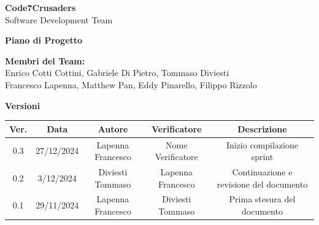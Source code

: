 \documentclass{article}
\begin{document}
\begin{titlepage}
    {\Huge \textbf{Code7Crusaders}}\\
    \vspace{0.5cm}
    {\Large Software Development Team}\\
    \vspace{2cm}

    {\large \textbf{Piano di Progetto}}\\
    \vspace{5cm}


    \textbf{Membri del Team:}\\
    Enrico Cotti Cottini, Gabriele Di Pietro, Tommaso Diviesti \\
    Francesco Lapenna, Matthew Pan, Eddy Pinarello, Filippo Rizzolo \\
    \vspace{0.5cm}

    \vspace{1cm}
\end{titlepage}



\newpage
\begin{table}[h!]
\centering
\textbf{Versioni} \\ %
\vspace{2mm} %
\begin{tabular}{|c|c|c|c|c|}
    \hline
    \textbf{Ver.} & \textbf{Data} & \textbf{Autore} & \textbf{Verificatore} & \textbf{Descrizione} \\
    \hline
    0.3 & 27/12/2024 & Lapenna Francesco & Nome Verificatore & Inizio compilazione sprint \\
    0.2 & 3/12/2024 & Diviesti Tommaso & Lapenna Francesco & Continuazione e revisione del documento \\
    0.1 & 29/11/2024 & Lapenna Francesco & Diviesti Tommaso & Prima stesura del documento \\
    \hline
\end{tabular}
\end{table}



\newpage
\tableofcontents
\listoftables
\listoffigures
\end{document}
